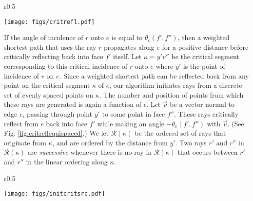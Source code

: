 \documentclass[11pt]{article}
\def\calR{\mathcal{R}}
\begin{document}
	\begin{wrapfigure}{r}{0.5\textwidth}
	\centering
	\begin{minipage}[t]{\linewidth}
	\centering
	\texttt{[image: figs/critrefl.pdf]}
	\vspace{-0.15in}
	\caption{\footnotesize Illustrating critical reflection}
	\label{fig:critreflequispaced}
	\end{minipage}
	\end{wrapfigure}

If the angle of incidence of $r$ onto $e$ is equal to $\theta_c(f', f'')$, then a weighted shortest path that uses the ray $r$ propagates along $e$ for a positive distance before critically reflecting back into face $f'$ itself. 
Let $\kappa = y'v''$ be the critical segment corresponding to this critical incidence of $r$ onto $e$ where $y'$ is the point of incidence of $r$ on $e$.
Since a weighted shortest path can be reflected back from any point on the critical segment $\kappa$ of $e$, 
our algorithm initiates rays from a discrete set of evenly spaced points on $\kappa$.
The number and position of points from which these rays are generated is again a function of $\epsilon$.
Let $\overrightarrow{v}$ be a vector normal to edge $e$, passing through point $y'$ to some point in face $f''$.
These rays critically reflect from $e$ back into face $f'$ while making an angle $-\theta_c(f', f'')$ with $\overrightarrow{v}$. 
(See Fig. \ref{fig:critreflequispaced}.)
We let $\calR(\kappa)$ be the ordered set of rays that originate from $\kappa$, and are ordered by the distance from $y'$. 
Two rays $r'$ and $r''$ in $\mathcal{R}(\kappa)$ are {\it successive} whenever there is no ray in $\mathcal{R}(\kappa)$ that occurs between $r'$ and $r''$ in the linear ordering along $\kappa$.

	\begin{wrapfigure}{r}{0.5\textwidth}
	\centering
	\begin{minipage}[t]{\linewidth}
	\centering
	\texttt{[image: figs/initcritsrc.pdf]}
	\caption{\footnotesize Illustrating rays initiated from a critical source $y'$ and the corresponding sibling pair $r, r_3$}
	\label{fig:initcritsrc}
	\end{minipage}
	\end{wrapfigure}
\end{document}
